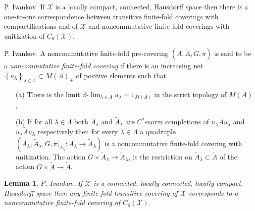 \documentclass{beamer}
\theoremstyle{plain}
\newtheorem{lem}{Lemma}%
\newcommand{\sX}{\mathcal{X}}       %
\begin{document}
\begin{frame}
\begin{lemma}
	\alert{P. Ivankov}. If $\mathcal X$ is a locally compact, connected, Hausdorff space then there is a one-to-one correspondence between transitive finite-fold coverings with compactifications and of $\mathcal X$ and noncommutative finite-fold coverings with unitization of $C_0\left(\mathcal X\right)$.
\end{lemma}
\begin{definition}
	\alert{P. Ivankov}.	A   noncommutative finite-fold  pre-covering $\left(A, \widetilde{A}, G, \pi \right)$ is said to be  a \textit{noncommutative finite-fold covering} if there is an increasing net $\left\{u_\lambda\right\}_{\lambda\in\Lambda}\subset M\left( A\right)_+ $  of positive elements such that
	\begin{enumerate}
		\item[(a)] There is the limit 
		$
		\beta\text{-}\lim_{\lambda \in \Lambda} u_\lambda = 1_{M\left(A \right) }
		$
		in the strict topology of $M\left(A \right)$,
		\item[(b)]  If for all   $\lambda\in\Lambda$ both $A_\lambda$ and  $\widetilde A_\lambda$ are $C^*$-norm completions  of $u_\lambda A u_\lambda$ and  $u_\lambda\widetilde{A}u_\lambda$ respectively then for every $\lambda\in\Lambda$ a quadruple
		$
		\left(A_\lambda, \widetilde{A}_\lambda, G, \left.\pi\right|_{A_\lambda} :A_\lambda\to \widetilde{A}_\lambda\right)	
		$
		is a noncommutative finite-fold covering with unitization. The action 	$G \times \widetilde{A}_\lambda\to \widetilde{A}_\lambda$, is the restriction on $\widetilde{A}_\lambda\subset \widetilde{   A}$ of the action $G\times  \widetilde{A}\to \widetilde{A}$.
	\end{enumerate}
	
\end{definition}
\end{frame}
\begin{frame}
\begin{lem}
	\alert{P. Ivankov}. 	If $\mathcal X$ is a connected, locally connected, locally compact, Hausdorff space  then any finite-fold transitive covering of $\sX$ corresponds to a noncommutative finite-fold  covering of $C_0\left(\sX \right)$. 
\end{lem}
\end{frame}
\end{document}
